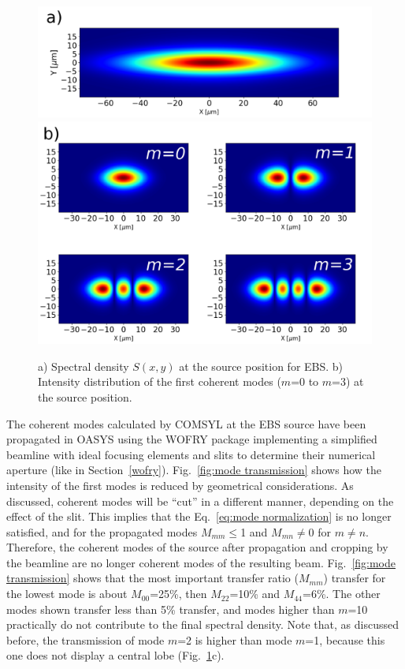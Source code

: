 \documentclass{iucr}              %
\begin{document}
\begin{figure}\label{fig:spectraldensity}
    \centering
        \includegraphics[width=\textwidth]{GRAPHICS/ebs_spectral_density.png}
        \includegraphics[width=\textwidth]{GRAPHICS/figure9b.png}
    \caption{a) Spectral density $S(x,y)$ at the source position for EBS. b) Intensity distribution of the first coherent modes ($m$=0 to $m$=3) at the source position.
    }
\end{figure}


The coherent modes calculated by COMSYL at the EBS source have been propagated in OASYS using the WOFRY package implementing a simplified beamline with ideal focusing elements and slits to determine their numerical aperture (like in Section~\ref{wofry}). Fig.~\ref{fig:mode transmission} shows how the intensity of the first modes is reduced by geometrical considerations. 
As discussed, coherent modes will be ``cut'' in a different manner, depending on the effect of the slit.
This implies that the Eq.~\ref{eq:mode normalization} is no longer satisfied, and for the propagated modes $M_{mm}\le$1 and $M_{mn}\ne$0 for $m\ne n$. Therefore, the coherent modes of the source after propagation and cropping by the beamline are no longer coherent modes of the resulting beam. Fig.~\ref{fig:mode transmission} shows that the most important transfer ratio ($M_{mm}$) transfer for the lowest mode is about $M_{00}$=25\%, then $M_{22}$=10\% and $M_{44}$=6\%. The other modes shown transfer less than 5\% transfer, and modes higher than $m$=10 practically do not contribute to the final spectral density. Note that, as discussed before, the transmission of mode $m$=2 is higher than mode $m$=1, because this one does not display a central lobe (Fig.~\ref{fig:spectraldensity}c).  
\end{document}
